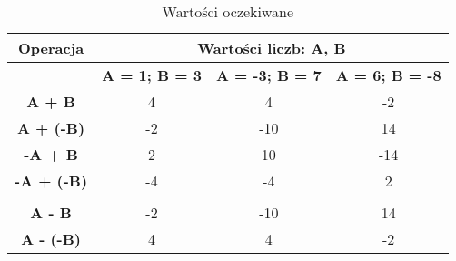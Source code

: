 \documentclass[12pt, a4paper, onside, polish]{article}				%
\begin{document}
\begin{table}[H]
\caption{Wartości oczekiwane}
\centering
\begin{tabular}{|c|ccc|}
\hline
\rowcolor[HTML]{9B9B9B} 
Operacja                                   & \multicolumn{3}{c|}{\cellcolor[HTML]{9B9B9B}Wartości liczb: A, B}                                                                                                                         \\ \hline
                                           & \multicolumn{1}{c|}{\cellcolor[HTML]{EFEFEF}\textbf{A = 1; B = 3}} & \multicolumn{1}{c|}{\cellcolor[HTML]{EFEFEF}\textbf{A = -3; B = 7}} & \cellcolor[HTML]{EFEFEF}\textbf{A = 6; B = -8} \\ \hline
\cellcolor[HTML]{EFEFEF}\textbf{A + B}     & \multicolumn{1}{c|}{4}                                             & \multicolumn{1}{c|}{4}                                              & -2                                             \\ \hline
\cellcolor[HTML]{EFEFEF}\textbf{A + (-B)}  & \multicolumn{1}{c|}{-2}                                            & \multicolumn{1}{c|}{-10}                                            & 14                                             \\ \hline
\cellcolor[HTML]{EFEFEF}\textbf{-A + B}    & \multicolumn{1}{c|}{2}                                             & \multicolumn{1}{c|}{10}                                             & -14                                            \\ \hline
\cellcolor[HTML]{EFEFEF}\textbf{-A + (-B)} & \multicolumn{1}{c|}{-4}                                            & \multicolumn{1}{c|}{-4}                                             & 2                                              \\ \hline
\cellcolor[HTML]{EFEFEF}\textbf{}          & \multicolumn{1}{c|}{}                                              & \multicolumn{1}{c|}{}                                               &                                                \\ \hline
\cellcolor[HTML]{EFEFEF}\textbf{A - B}     & \multicolumn{1}{c|}{-2}                                            & \multicolumn{1}{c|}{-10}                                            & 14                                             \\ \hline
\cellcolor[HTML]{EFEFEF}\textbf{A - (-B)}  & \multicolumn{1}{c|}{4}                                             & \multicolumn{1}{c|}{4}                                              & -2                                             \\ \hline

\end{tabular}
\end{table}
\end{document}
